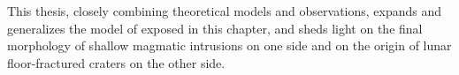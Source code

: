 This thesis,  closely combining  theoretical models  and observations,
expands and generalizes the model of \citet{Michaut:2011kg} exposed in
this  chapter, and  sheds light  on  the final  morphology of  shallow
magmatic  intrusions  on   one  side  and  on  the   origin  of  lunar
floor-fractured craters on the other side.



